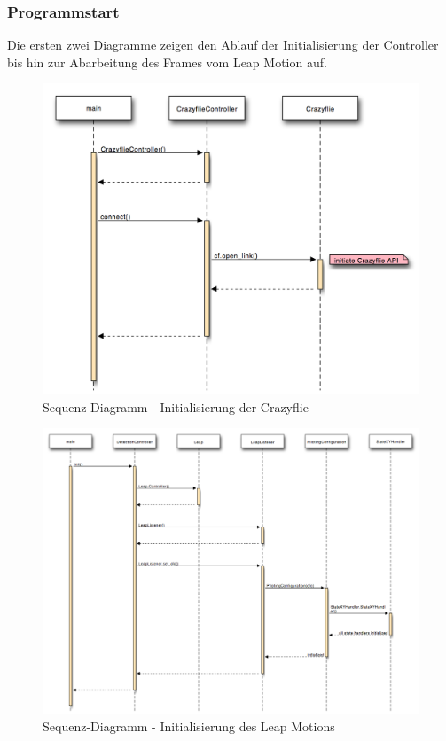 \subsubsection{Programmstart}
Die ersten zwei Diagramme zeigen den Ablauf der Initialisierung der Controller bis hin zur Abarbeitung des Frames vom Leap Motion auf.
\begin{figure}[H]
	\centering
	\includegraphics[width=1.0\textwidth]{figures/poc/seq_dia_crazyflie.png}
	\caption{Sequenz-Diagramm - Initialisierung der Crazyflie}
\end{figure}

%	


\begin{figure}
	\includegraphics[width=1.0\textwidth]{figures/poc/seq_dia_detection_part1.png}
	\caption{Sequenz-Diagramm - Initialisierung des Leap Motions}
\end{figure}

